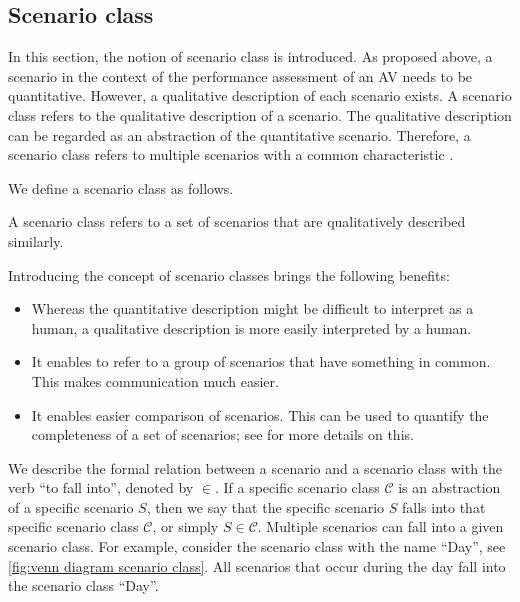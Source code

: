 \subsection{Scenario class}
\label{sec:scenario class}

In this section, the notion of scenario class is introduced. As proposed above, a scenario in the context of the performance assessment of an AV needs to be quantitative. However, a qualitative description of each scenario exists. 
A scenario class refers to the qualitative description of a scenario.
The qualitative description can be regarded as an abstraction of the quantitative scenario. Therefore, a scenario class refers to multiple scenarios with a common characteristic \cite{elrofai2018scenario}.

We define a scenario class as follows.
\begin{definition} \label{def:scenario class}
	A scenario class refers to a set of scenarios that are qualitatively described similarly.
\end{definition}



Introducing the concept of scenario classes brings the following benefits:
\begin{itemize}
	\item Whereas the quantitative description might be difficult to interpret as a human, a qualitative description is more easily interpreted by a human.
	\item It enables to refer to a group of scenarios that have something in common. This makes communication much easier.
	\item It enables easier comparison of scenarios. This can be used to quantify the completeness of a set of scenarios; see \cite{degelder2019completeness} for more details on this.
\end{itemize}

We describe the formal relation between a scenario and a scenario class with the verb ``to fall into'', denoted by $\in$. If a specific scenario class $\mathcal{C}$ is an abstraction of a specific scenario $S$, then we say that the specific scenario $S$ falls into that specific scenario class $\mathcal{C}$, or simply $S \in \mathcal{C}$. Multiple scenarios can fall into a given scenario class. For example, consider the scenario class with the name ``Day'', see \cref{fig:venn diagram scenario class}. All scenarios that occur during the day fall into the scenario class ``Day''.

